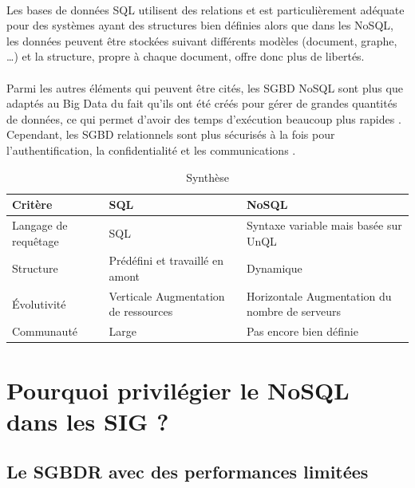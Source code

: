 \paragraph{}Les bases de données SQL utilisent des relations et est particulièrement adéquate pour des systèmes ayant des structures bien définies alors que dans les NoSQL, les données peuvent être stockées suivant différents modèles (document, graphe, …) et la structure, propre à chaque document, offre donc plus de libertés.

\paragraph{}Parmi les autres éléments qui peuvent être cités, les SGBD NoSQL sont plus que adaptés au Big Data du fait qu’ils ont été créés pour gérer de grandes quantités de données, ce qui permet d’avoir des temps d’exécution beaucoup plus rapides \supercite{comparatifmongomysql}. Cependant, les SGBD relationnels sont plus sécurisés à la fois pour l’authentification, la confidentialité et les communications \supercite{serveyNoSQL}.

\begin{table}[h!]
\begin{tabularx}{\textwidth} { 
  | >{\centering\arraybackslash}X 
  | >{\raggedright\arraybackslash}X 
  | >{\raggedright\arraybackslash}X | }
 \hline
\rowcolor{lightgray}
 \textbf{Critère} & \textbf{SQL} & \textbf{NoSQL} \\
 \hline
 Langage de requêtage  & SQL   & Syntaxe variable mais basée sur UnQL  \\
\hline
 Structure  & Prédéfini et travaillé en amont   & Dynamique  \\
\hline
 Évolutivité  & Verticale \newline Augmentation de ressources  & Horizontale \newline  Augmentation du nombre de serveurs \\
\hline
 Communauté  & Large  & Pas encore bien définie  \\

\hline
\end{tabularx}
\caption{Synthèse}
\end{table}

\section{Pourquoi privilégier le NoSQL dans les SIG ?}

\subsection{Le SGBDR avec des performances limitées}

